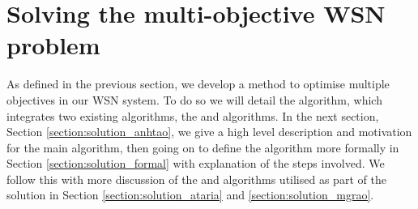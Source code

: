 \section{Solving the multi-objective WSN problem}
\label{section:solution}
As defined in the previous section, we develop a method to optimise multiple objectives in our WSN system. To do so we will detail the \acronymWSNOptimisationExtended{}{} algorithm, which integrates two existing algorithms, the \acronymATARIAExtended{}{} and \acronymMGRAOExtended{}{} algorithms. In the next section, Section \ref{section:solution_anhtao}, we give a high level description and motivation for the main \acronymWSNOptimisation{}{} algorithm, then going on to define the algorithm more formally in Section \ref{section:solution_formal} with explanation of the steps involved. We follow this with more discussion of the \acronymATARIA{}{} and \acronymMGRAO{}{} algorithms utilised as part of the solution in Section \ref{section:solution_ataria} and \ref{section:solution_mgrao}.
